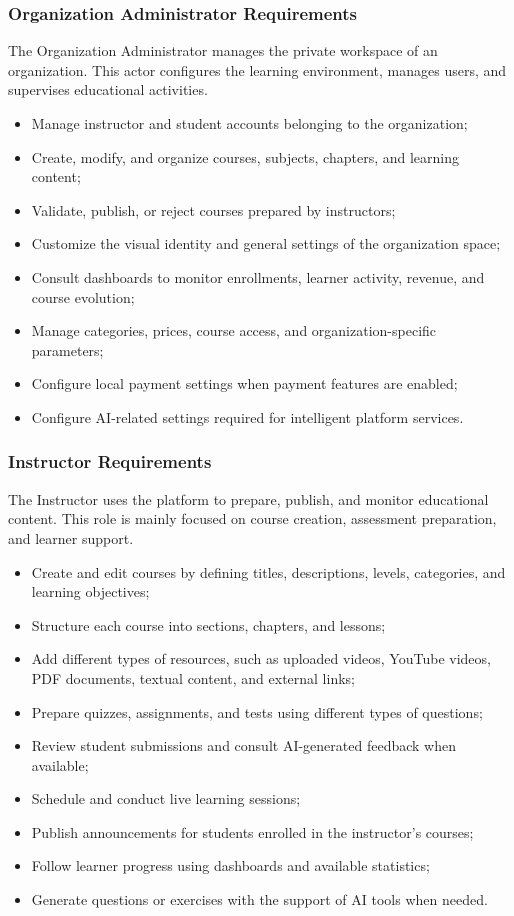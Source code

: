 \subsubsection{Organization Administrator Requirements}

The Organization Administrator manages the private workspace of an organization. This actor
configures the learning environment, manages users, and supervises educational activities.

\begin{itemize}
  \item Manage instructor and student accounts belonging to the organization;
  \item Create, modify, and organize courses, subjects, chapters, and learning content;
  \item Validate, publish, or reject courses prepared by instructors;
  \item Customize the visual identity and general settings of the organization space;
  \item Consult dashboards to monitor enrollments, learner activity, revenue, and course
        evolution;
  \item Manage categories, prices, course access, and organization-specific parameters;
  \item Configure local payment settings when payment features are enabled;
  \item Configure AI-related settings required for intelligent platform services.
\end{itemize}

\subsubsection{Instructor Requirements}

The Instructor uses the platform to prepare, publish, and monitor educational content.
This role is mainly focused on course creation, assessment preparation, and learner support.

\begin{itemize}
  \item Create and edit courses by defining titles, descriptions, levels, categories, and
        learning objectives;
  \item Structure each course into sections, chapters, and lessons;
  \item Add different types of resources, such as uploaded videos, YouTube videos, PDF
        documents, textual content, and external links;
  \item Prepare quizzes, assignments, and tests using different types of questions;
  \item Review student submissions and consult AI-generated feedback when available;
  \item Schedule and conduct live learning sessions;
  \item Publish announcements for students enrolled in the instructor's courses;
  \item Follow learner progress using dashboards and available statistics;
  \item Generate questions or exercises with the support of AI tools when needed.
\end{itemize}

